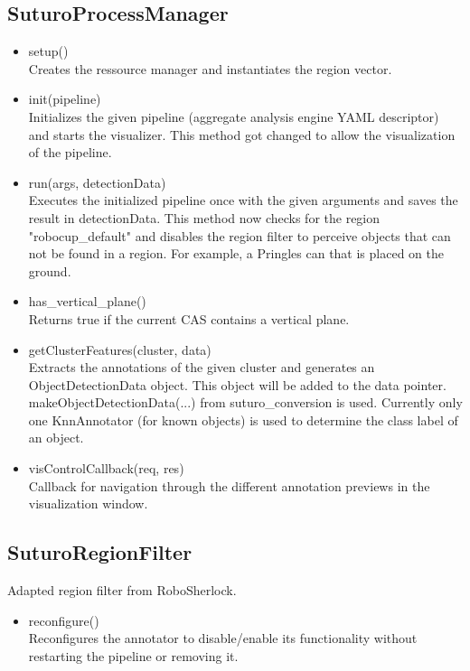 \documentclass[main.tex]{subfiles}
\begin{document}
\subsection{SuturoProcessManager}
\begin{itemize}
\item setup()\\
Creates the ressource manager and instantiates the region vector.

\item init(pipeline)\\
Initializes the given pipeline (aggregate analysis engine YAML descriptor) and starts the visualizer.
This method got changed to allow the visualization of the pipeline.

\item run(args, detectionData)\\
Executes the initialized pipeline once with the given arguments and saves the result in detectionData.
This method now checks for the region "robocup\_default" and disables the region filter to perceive objects that can not be found
in a region. For example, a Pringles can that is placed on the ground.

\item has\_vertical\_plane()\\
Returns true if the current CAS contains a vertical plane.

\item getClusterFeatures(cluster, data)\\
Extracts the annotations of the given cluster and generates an ObjectDetectionData object. 
This object will be added to the data pointer. makeObjectDetectionData(...) from suturo\_conversion is used.
Currently only one KnnAnnotator (for known objects) is used to determine the class label of an object.

\item visControlCallback(req, res)\\
Callback for navigation through the different annotation previews in the visualization window.
\end{itemize}

\subsection{SuturoRegionFilter}
Adapted region filter from RoboSherlock.

\begin{itemize}
\item reconfigure()\\
Reconfigures the annotator to disable/enable its functionality without restarting the pipeline or removing it.
\end{itemize}
\end{document}
